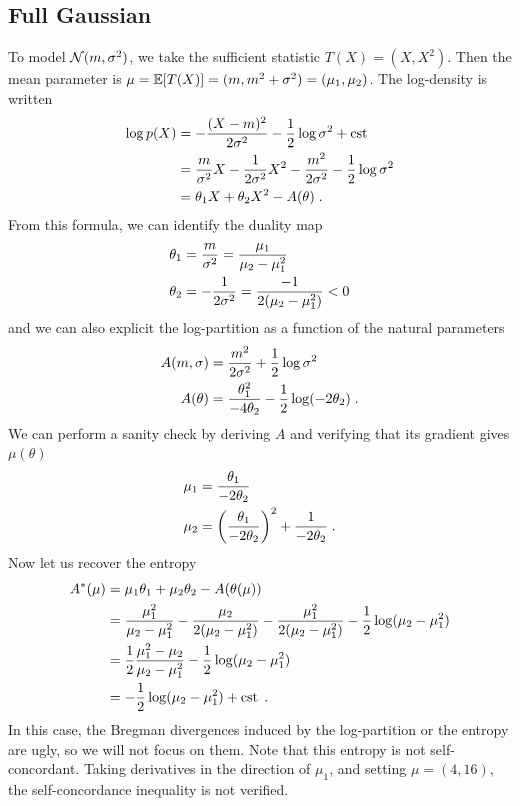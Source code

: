 \documentclass{article}
\newcommand{\logpart}{A}
\newcommand{\conj}{\logpart^*}
\newcommand{\natp}{\theta}
\begin{document}
\subsection{Full Gaussian}
To model ${\mathcal N}(m,\sigma^2)$, we take the sufficient statistic $T(X) = (X, X^2)$. Then the mean parameter is $\mu = \operatorname{\mathbb{E}}[T(X)] = ( m , m^2 + \sigma^2) = (\mu_1, \mu_2) $.
The log-density is written
\begin{align}
	\log p(X) 
	&= -\frac{(X-m)^2}{2 \sigma^2} - \half \log \sigma^2 + \cst \\
	&=  \frac{m}{\sigma^2} X -\inv{2 \sigma^2} X^2 - \frac{m^2}{2 \sigma^2} - \half \log \sigma^2 \\
	&=  \natp_1 X + \natp_2 X^2  - \logpart(\natp) \; .
\end{align}
From this formula, we can identify the duality map
\begin{align}
	\natp_1 &= \frac{m}{\sigma^2} = \frac{\mu_1}{\mu_2 - \mu_1^2} \\
	\natp_2 &= -\inv{2 \sigma^2} =  \frac{ - 1}{2(\mu_2 - \mu_1^2)}  < 0
\end{align}
and we can also explicit the log-partition as a function of the natural parameters
\begin{align}
	\logpart(m, \sigma) &= \frac{m^2}{2 \sigma^2} + \half \log \sigma^2 \\
	\logpart(\natp) &= \frac{\natp_1^2}{-4\natp_2} - \half \log(-2\natp_2) \; .
\end{align}
We can perform a sanity check by deriving $\logpart$ and verifying that its gradient gives $\mu(\natp)$
\begin{align}
	\mu_1 &= \frac{\natp_1}{-2\natp_2}  \\
	\mu_2 & = \left( \frac{\natp_1}{-2\natp_2} \right)^2 + \inv{-2 \natp_2} \; .
\end{align}
Now let us recover the entropy
\begin{align}
	\conj (\mu) &= \mu_1 \natp_1 + \mu_2 \natp_2  - \logpart(\natp(\mu)) \\
	& = \frac{\mu_1^2}{\mu_2 - \mu_1^2}  - \frac{\mu_2}{2(\mu_2 - \mu_1^2)} - \frac{\mu_1^2}{2(\mu_2 - \mu_1^2)}  - \half \log(\mu_2 - \mu_1^2) \\
	&= \half \frac{\mu_1^2 - \mu_2}{\mu_2 - \mu_1^2} - \half \log(\mu_2 - \mu_1^2) \\
	& = - \half \log (\mu_2 - \mu_1^2) + \cst \; .
\end{align}
In this case, the Bregman divergences induced by the log-partition or the entropy are ugly, so we will not focus on them.
Note that this entropy is not self-concordant. Taking derivatives in the direction of $\mu_1$, and setting $\mu = (4, 16)$,  the self-concordance inequality is not verified.
\end{document}
